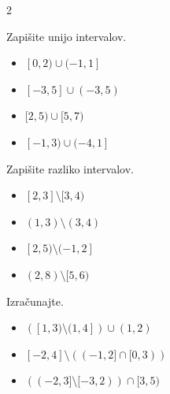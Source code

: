 \begin{multicols}{2}
        
            \begin{naloga}
                Zapišite unijo intervalov.
                \begin{itemize}
                        \item $ [0,2)\cup(-1,1]$ 
                        \item $ [-3,5]\cup(-3,5)$ 
                        \item $ [2,5)\cup[5,7)$ 
                        \item $ [-1,3)\cup(-4,1]$ 
                \end{itemize}
            \end{naloga}
        


        
        
            \begin{naloga}
                Zapišite razliko intervalov.
                \begin{itemize}
                        \item $ [2,3]\setminus[3,4)$ 
                        \item $ (1,3)\setminus(3,4)$ 
                        \item $ [2,5)\setminus(-1,2]$ 
                        \item $ (2,8)\setminus[5,6)$ 
                \end{itemize}
            \end{naloga}
        


        
            \begin{naloga}
                Izračunajte.
                \begin{itemize}
                        \item $\left([1,3)\setminus(1,4]\right)\cup(1,2)$ 
                        \item $[-2,4]\setminus\left((-1,2]\cap[0,3)\right)$ 
                        \item $\left((-2,3]\setminus[-3,2)\right)\cap[3,5)$ 
                \end{itemize}
            \end{naloga}
        

            ~\\~\\~\\~\\~\\~\\
                \end{multicols}

